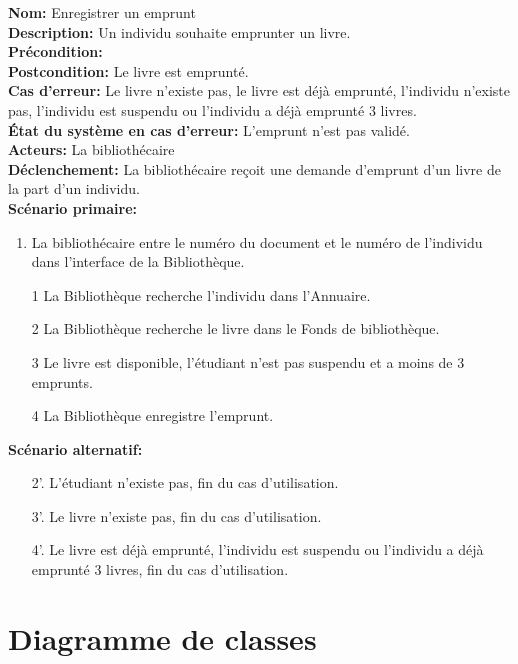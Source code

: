 \documentclass{article}
\begin{document}
\noindent\textbf{Nom:} Enregistrer un emprunt \\
\textbf{Description:} Un individu souhaite emprunter un livre.\\
\textbf{Précondition:} \\
\textbf{Postcondition:} Le livre est emprunté.\\
\textbf{Cas d'erreur:} Le livre n’existe pas, le livre est déjà emprunté, l’individu n’existe pas, l’individu est suspendu ou l’individu a déjà emprunté 3 livres.\\
\textbf{État du système en cas d'erreur:} L’emprunt n'est pas validé.\\
\textbf{Acteurs:} La bibliothécaire \\
\textbf{Déclenchement:} La bibliothécaire reçoit une demande d'emprunt d'un livre de la part d'un individu.\\
\textbf{Scénario primaire:}
\begin{enumerate}
	\item La bibliothécaire entre le numéro du document et le numéro de l'individu dans l'interface de la Bibliothèque.
	\item[1] La Bibliothèque recherche l'individu dans l'Annuaire.
	\item[2] La Bibliothèque recherche le livre dans le Fonds de bibliothèque.
	\item[3] Le livre est disponible, l'étudiant n'est pas suspendu et a moins de 3 emprunts.
	\item[4] La Bibliothèque enregistre l'emprunt.
\end{enumerate}

\noindent\textbf{Scénario alternatif:}
\begin{itemize}
	\item[2'.] L’étudiant n’existe pas, fin du cas d’utilisation.
	\item[3'.] Le livre n’existe pas, fin du cas d’utilisation.
	\item[4'.] Le livre est déjà emprunté, l’individu est suspendu ou l’individu a déjà emprunté 3 livres, fin du cas d’utilisation.
\end{itemize}


\section{Diagramme de classes}
\end{document}
